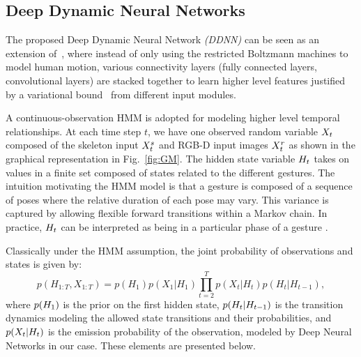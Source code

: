 \subsection{Deep Dynamic Neural Networks}
\label{sec:DDNN}

The proposed Deep Dynamic Neural Network \emph{(DDNN)} can be seen as an extension of~\cite{diwucvpr14}, where instead of only using the restricted Boltzmann machines to model human motion, various connectivity layers (fully connected layers, convolutional layers) are stacked together to learn higher level features justified by a variational bound~\cite{hinton2006fast} from different input modules.

A continuous-observation HMM  is adopted for modeling higher level temporal relationships.
At each time step $t$, we have one observed random variable $X_t$
composed of the skeleton input $X^{s}_t$ and RGB-D input images $X^{r}_t$
as shown in the graphical representation in Fig.~\ref{fig:GM}.
%
 The hidden state variable $H_t$ takes on values in a finite set  \finiteset composed of \numberhiddenstate states related to
the different gestures.
 The intuition motivating the HMM model is that a gesture is composed of a sequence of poses where the relative duration of each pose may vary.
This variance is captured by allowing flexible forward transitions within a Markov chain.
In practice,  $H_t$ can be interpreted as being in a particular phase  of a gesture \gesturea{}.

Classically under the HMM assumption, the joint probability of observations and states is given by:
\begin{equation}
p(H_{1:T},X_{1:T}) = p(H_1)p(X_1 | H_1) \prod^{T}_{t=2} p(X_t | H_t ) p(H_t | H_{t-1}),
\label{HMM_GM_1}
\end{equation}
where $p(H_1)$ is the prior on the first hidden state, $p(H_t|H_{t-1})$
is the transition dynamics modeling the allowed state transitions and their probabilities,
 and $p(X_t | H_t )$ is the emission probability of the observation,
modeled by  Deep Neural Networks in our case. These elements are presented below.



